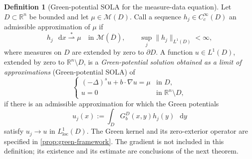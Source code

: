 \documentclass[reqno]{amsart}
\numberwithin{equation}{section}
\theoremstyle{plain}
\theoremstyle{definition}
\newtheorem{definition}[theorem]{Definition}
\theoremstyle{remark}
\newcommand{\R}{\mathbb R}
\newcommand{\M}{\mathcal M}
\newcommand{\differential}{\mathop{}\!\mathrm d}
\newcommand{\rev}[1]{#1}
\begin{document}
\begin{definition}[\rev{Green-potential SOLA for the measure-data equation}]
\label{def:sola-measure}
Let $D\subset\R^n$ be bounded and let $\mu\in\M(D)$.  Call a sequence
$h_j\in C_c^\infty(D)$ an admissible approximation
of $\mu$ if
\[
 h_j\,\differential x\stackrel{*}{\rightharpoonup}\mu
 \quad\text{in }\M(\overline D),
 \qquad \sup_j\|h_j\|_{L^1(D)}<\infty,
\]
where measures on $D$ are extended by zero to $\partial D$.  A
function $u\in L^1(D)$, extended by zero to $\R^n\setminus D$, is a
\emph{Green-potential solution obtained as a limit of approximations}
(Green-potential SOLA) of
\begin{equation}\label{eq:measure-dirichlet-main}
 \begin{cases}
 (-\Delta)^su+b\cdot\nabla u=\mu&\text{in }D,\\
 u=0&\text{in }\R^n\setminus D,
 \end{cases}
\end{equation}
if there is an admissible approximation for which the Green potentials
\[
 u_j(x):=\int_DG_b^D(x,y)h_j(y)\,\differential y
\]
satisfy $u_j\to u$ in $L^1_{\mathrm{loc}}(D)$.  \rev{The Green kernel and
its zero-exterior operator are specified in
\cref{prop:green-framework}.}
The gradient is not included in this definition; its existence and its
estimate are conclusions of the next theorem.
\end{definition}
\end{document}
